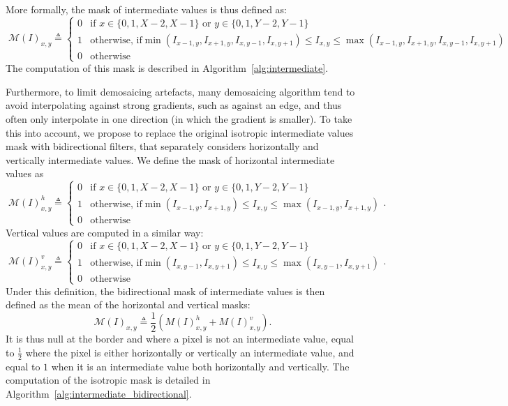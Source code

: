 \documentclass{ipol}
\begin{document}
More formally, the mask of intermediate values is thus defined as:
\[\phantom.\mathcal M(I)_{x, y} \triangleq \left\{\begin{array}{ll}
        0 &\text{if }x\in\{0, 1, X-2, X-1\}\text{ or }y\in\{0, 1, Y-2, Y-1\}\\
        1 &\text{otherwise, if}\min(I_{x-1, y}, I_{x+1, y}, I_{x, y-1}, I_{x, y+1}) \leq I_{x, y} \leq \max(I_{x-1, y}, I_{x+1, y}, I_{x, y-1}, I_{x, y+1})\\
0 &\text{otherwise}\end{array}\right.\]
The computation of this mask is described in Algorithm~\ref{alg:intermediate}.

Furthermore, to limit demosaicing artefacts, many demosaicing algorithm tend to avoid interpolating against strong gradients, such as against an edge, and thus often only interpolate in one direction (in which the gradient is smaller). To take this into account, we propose to replace the original isotropic intermediate values mask with bidirectional filters, that separately considers horizontally and vertically intermediate values. We define the mask of horizontal intermediate values as
\[\phantom.\mathcal M(I)^h_{x, y} \triangleq \left\{\begin{array}{ll}
        0 &\text{if }x\in\{0, 1, X-2, X-1\}\text{ or }y\in\{0, 1, Y-2, Y-1\}\\
        1 &\text{otherwise, if}\min(I_{x-1, y}, I_{x+1, y}) \leq I_{x, y} \leq \max(I_{x-1, y}, I_{x+1, y})\\
0 &\text{otherwise}\end{array}\right..\]
Vertical values are computed in a similar way:
\[\phantom.\mathcal M(I)^v_{x, y} \triangleq \left\{\begin{array}{ll}
        0 &\text{if }x\in\{0, 1, X-2, X-1\}\text{ or }y\in\{0, 1, Y-2, Y-1\}\\
        1 &\text{otherwise, if}\min(I_{x, y-1}, I_{x, y+1}) \leq I_{x, y} \leq \max(I_{x, y-1}, I_{x, y+1})\\
0 &\text{otherwise}\end{array}\right..\]
Under this definition, the bidirectional mask of intermediate values is then defined as the mean of the horizontal and vertical masks:
\[\phantom.\mathcal M(I)_{x, y} \triangleq\frac 1 2 \left(M(I)^h_{x, y} + M(I)^v_{x, y}\right).\]
It is thus null at the border and where a pixel is not an intermediate value, equal to $\frac 1 2$ where the pixel is either horizontally or vertically an intermediate value, and equal to $1$ when it is an intermediate value both horizontally and vertically. The computation of the isotropic mask is detailed in Algorithm~\ref{alg:intermediate_bidirectional}.
\end{document}
